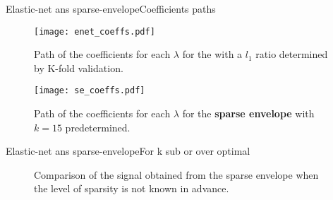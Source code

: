 \documentclass[10pt,aspectratio=43]{beamer}
\begin{document}

\begin{frame}{Elastic-net ans sparse-envelope}{Coefficients paths}
\begin{center}
\begin{figure}
  \begin{minipage}[c]{0.67\textwidth}
   \texttt{[image: enet\_coeffs.pdf]}
   \end{minipage}\hfill
  \begin{minipage}[c]{0.3\textwidth}
    \caption{
   Path of the coefficients for each $\lambda$ for the \enet with a $l_1$ ratio determined by K-fold validation.
    }
  \end{minipage}
\end{figure}

\begin{figure}
  \begin{minipage}[c]{0.67\textwidth}
   \texttt{[image: se\_coeffs.pdf]}
   \end{minipage}\hfill
  \begin{minipage}[c]{0.3\textwidth}
    \caption{
      Path of the coefficients for each $\lambda$ for the \textbf{sparse envelope} with $k=15$ predetermined.
    }
  \end{minipage}
\end{figure}
\end{center}
\end{frame}

\begin{frame}{Elastic-net ans sparse-envelope}{For k sub or over optimal}
\begin{figure}
    \captionsetup[subfigure]{labelformat=empty}

\caption{Comparison of the signal obtained from the sparse envelope when the level of sparsity is not known in advance.}
\end{figure}
\end{frame}
\end{document}
